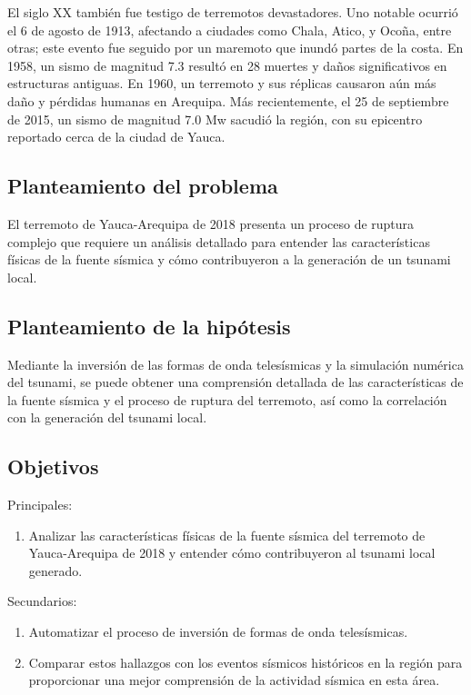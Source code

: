 \documentclass[spanish,a4paper,11pt]{article}
\begin{document}
El siglo XX también fue testigo de terremotos devastadores. Uno notable ocurrió el 6 de agosto de 1913, afectando a ciudades como Chala, Atico, y Ocoña, entre otras; este evento fue seguido por un maremoto que inundó partes de la costa. En 1958, un sismo de magnitud 7.3 resultó en 28 muertes y daños significativos en estructuras antiguas. En 1960, un terremoto y sus réplicas causaron aún más daño y pérdidas humanas en Arequipa. Más recientemente, el 25 de septiembre de 2015, un sismo de magnitud 7.0 Mw sacudió la región, con su epicentro reportado cerca de la ciudad de Yauca.

\subsection*{Planteamiento del problema}
El terremoto de Yauca-Arequipa de 2018 presenta un proceso de ruptura complejo que requiere un análisis detallado para entender las características físicas de la fuente sísmica y cómo contribuyeron a la generación de un tsunami local. \cite{CEN13}

\subsection*{Planteamiento de la hipótesis}
Mediante la inversión de las formas de onda telesísmicas y la simulación numérica del tsunami, se puede obtener una comprensión detallada de las características de la fuente sísmica y el proceso de ruptura del terremoto, así como la correlación con la generación del tsunami local.

\subsection*{Objetivos} 

Principales:

\begin{enumerate}
  \item Analizar las características físicas de la fuente sísmica del terremoto de Yauca-Arequipa de 2018 y entender cómo contribuyeron al tsunami local generado.
\end{enumerate}

Secundarios:

\begin{enumerate}
  \item Automatizar el proceso de inversión de formas de onda telesísmicas.
  \item Comparar estos hallazgos con los eventos sísmicos históricos en la región para proporcionar una mejor comprensión de la actividad sísmica en esta área.
\end{enumerate}
\end{document}
